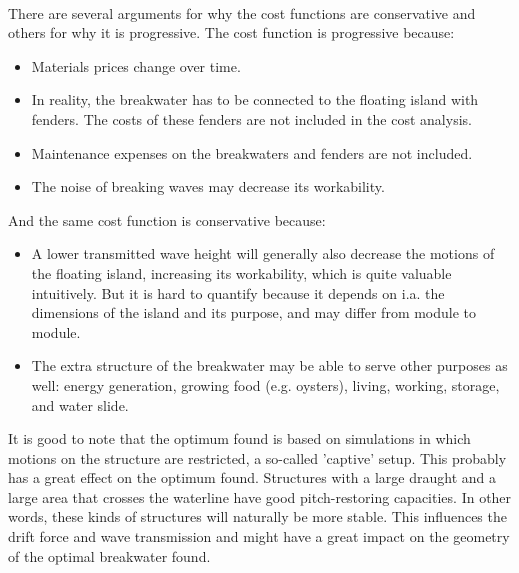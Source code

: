 \\
There are several arguments for why the cost functions are conservative and others for why it is progressive. The cost function is progressive because:
\begin{itemize}
    \item Materials prices change over time.
    \item In reality, the breakwater has to be connected to the floating island with fenders. The costs of these fenders are not included in the cost analysis.
    \item Maintenance expenses on the breakwaters and fenders are not included.
    \item The noise of breaking waves may decrease its workability. 
\end{itemize}
And the same cost function is conservative because:
\begin{itemize}
    \item A lower transmitted wave height will generally also decrease the motions of the floating island, increasing its workability, which is quite valuable intuitively. But it is hard to quantify because it depends on i.a. the dimensions of the island and its purpose, and may differ from module to module. 
    \item The extra structure of the breakwater may be able to serve other purposes as well: energy generation, growing food (e.g. oysters), living, working, storage, and water slide.
\end{itemize}

It is good to note that the optimum found is based on simulations in which motions on the structure are restricted, a so-called 'captive' setup. This probably has a great effect on the optimum found. Structures with a large draught and a large area that crosses the waterline have good pitch-restoring capacities. In other words, these kinds of structures will naturally be more stable. This influences the drift force and wave transmission and might have a great impact on the geometry of the optimal breakwater found.